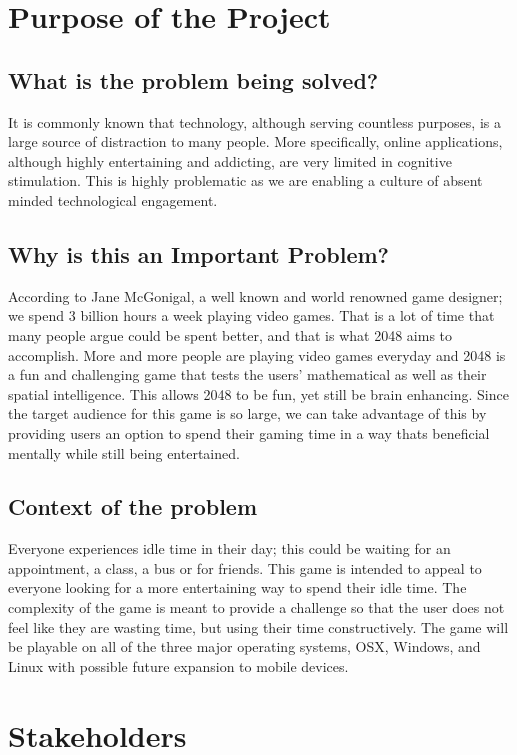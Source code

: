 \documentclass[12pt]{article}
\begin{document}
\section{Purpose of the Project}
\subsection{What is the problem being solved?}
\par\indent\indent It is commonly known that technology, although serving countless purposes, is a large source of distraction to many people. More specifically, online applications, although highly entertaining and addicting,
are very limited in cognitive stimulation. This is highly problematic as we are enabling a culture of absent minded technological engagement.
\subsection{Why is this an Important Problem?}
\par\indent\indent According to Jane McGonigal, a well known and world renowned game designer; we spend 3
billion hours a week playing video games. That is a lot of time that many people argue could be spent better, and
that is what 2048 aims to accomplish. More and more people are playing video games everyday and 2048 is a
fun and challenging game that tests the users' mathematical as well as their spatial intelligence. This allows 2048
to be fun, yet still be brain enhancing. Since the target audience for this game is so large, we can take advantage
of this by providing users an option to spend their gaming time in a way thats beneficial mentally while still being
entertained.
\subsection{Context of the problem}
\par\indent\indent Everyone experiences idle time in their day; this could be waiting for an appointment, a class, a
bus or for friends. This game is intended to appeal to everyone looking for a more entertaining way to spend their
idle time. The complexity of the game is meant to provide a challenge so that the user does not feel like they are
wasting time, but using their time constructively. The game will be playable on all of the three major operating
systems, OSX, Windows, and Linux with possible future expansion to mobile devices.

\section{Stakeholders}
\end{document}
